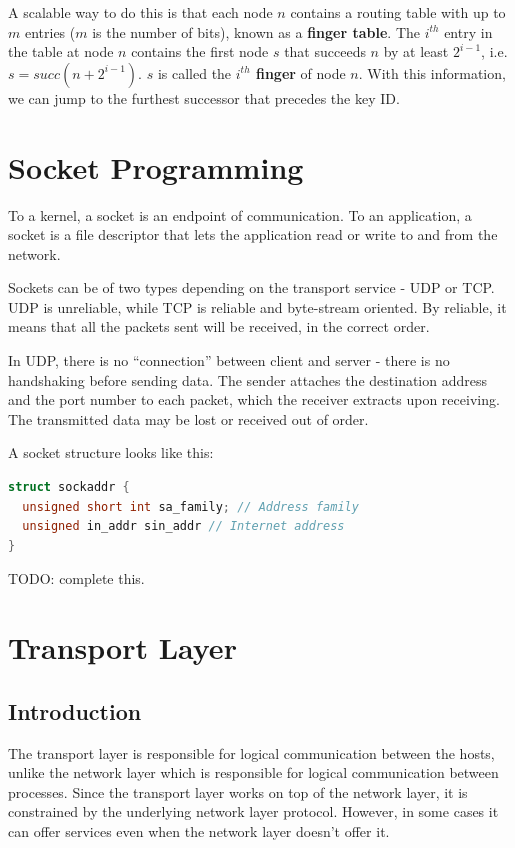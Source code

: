 \documentclass[12pt,letterpaper]{article}
\theoremstyle{definition}
\begin{document}
A scalable way to do this is that each node $n$ contains a routing table with up to $m$ entries ($m$ is the number of bits), known as a \textbf{finger table}. The $i^{th}$ entry in the table at node $n$ contains the first node $s$ that succeeds $n$ by at least $2^{i-1}$, i.e. $s = succ(n+2^{i-1})$. $s$ is called the \textbf{ $i^{th}$ finger} of node $n$. With this information, we can jump to the furthest successor that precedes the key ID.

\section{Socket Programming}

To a kernel, a socket is an endpoint of communication. To an application, a socket is a file descriptor that lets the application read or write to and from the network.

Sockets can be of two types depending on the transport service - UDP or TCP. UDP is unreliable, while TCP is reliable and byte-stream oriented. By reliable, it means that all the packets sent will be received, in the correct order. 

In UDP, there is no ``connection'' between client and server - there is no handshaking before sending data. The sender attaches the destination address and the port number to each packet, which the receiver extracts upon receiving. The transmitted data may be lost or received out of order.

A socket structure looks like this:

\begin{lstlisting}[language=C]
struct sockaddr {
  unsigned short int sa_family; // Address family
  unsigned in_addr sin_addr // Internet address
}
\end{lstlisting}

TODO: complete this.

\section{Transport Layer}

\subsection{Introduction}

The transport layer is responsible for logical communication between the hosts, unlike the network layer which is responsible for logical communication between processes. Since the transport layer works on top of the network layer, it is constrained by the underlying network layer protocol. However, in some cases it can offer services even when the network layer doesn't offer it.
\end{document}
